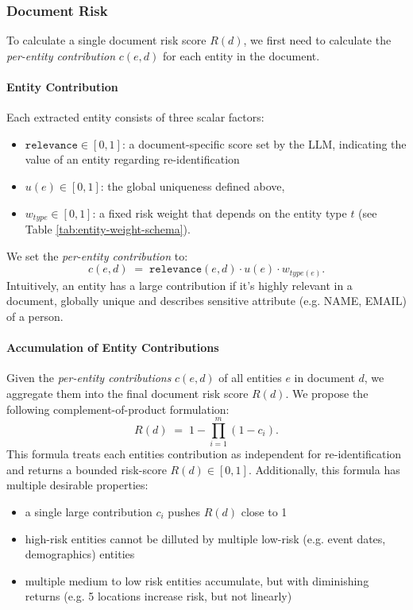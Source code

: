 \subsubsection{Document Risk}\label{subsubsec:document_risk}
To calculate a single document risk score $R(d)$, we first need to calculate the \textit{per-entity contribution} $c(e,d)$ for each entity in the document. 
\paragraph{Entity Contribution}
Each extracted entity consists of three scalar factors:
\begin{itemize}
\item $\texttt{relevance}\in[0,1]$: a document-specific score set by the LLM, indicating the value of an entity regarding re-identification
\item $u(e)\in[0,1]$: the global uniqueness defined above,
\item $w_{type}\in[0,1]$: a fixed risk weight that depends on the entity type $t$ (see Table \ref{tab:entity-weight-schema}).
\end{itemize}
We set the \textit{per-entity contribution} to:
\[
c(e,d) \;=\; \texttt{relevance}(e,d) \cdot u(e) \cdot w_{type(e)}.
\]
Intuitively, an entity has a large contribution if it's highly relevant in a document, globally unique and describes sensitive attribute (e.g. NAME, EMAIL) of a person.
\paragraph{Accumulation of Entity Contributions}
Given the \textit{per-entity contributions} $c(e,d)$ of all entities $e$ in document $d$, we aggregate them into the final document risk score $R(d)$. We propose the following complement-of-product formulation:
\[
R(d) \;=\; 1 - \prod_{i=1}^m (1 - c_i).
\]
This formula treats each entities contribution as independent for re-identification and returns a bounded risk-score $R(d)\in[0,1]$. Additionally, this formula has multiple desirable properties:
\begin{itemize}
    \item a single large contribution $c_i$ pushes $R(d)$ close to 1
    \item high-risk entities cannot be dilluted by multiple low-risk (e.g. event dates, demographics) entities 
    \item multiple medium to low risk entities accumulate, but with diminishing returns (e.g. 5 locations increase risk, but not linearly)
\end{itemize}

